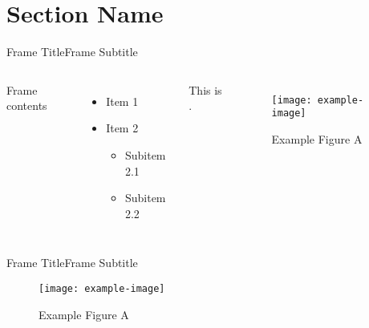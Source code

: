 \section{Section Name}
\graphicspath{{figs/section2/}} %

\begin{frame}{Frame Title}{Frame Subtitle}
    \begin{columns}
        Frame contents
            \begin{itemize}
                \item Item 1
                \item Item 2
                \begin{itemize}
                    \item Subitem 2.1 
                    \item Subitem 2.2 
                \end{itemize}
            \end{itemize}
            This is .
        \begin{figure}
            \begin{center}
                \texttt{[image: example-image]}
                \caption{Example Figure A}
            \end{center}
        \end{figure}
    \end{columns}
\end{frame}

\begin{frame}{Frame Title}{Frame Subtitle}
    \begin{figure}
        \begin{center}
            \texttt{[image: example-image]}
            \caption{Example Figure A}
        \end{center}
    \end{figure}
\end{frame}

